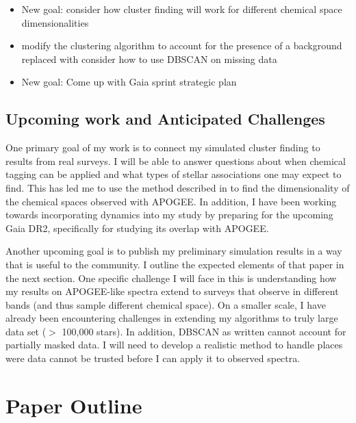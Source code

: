 \documentclass[11pt]{article}
\begin{document}
\begin{itemize}
\begin{itemize}
\begin{itemize}
		\end{itemize}
		\item New goal: {\color{ForestGreen} consider how cluster finding will work for different chemical space dimensionalities}
		\item {\color{BurntOrange} modify the clustering algorithm to account for the presence of a background} replaced with {\color{ForestGreen} consider how to use DBSCAN on missing data}
		\item New goal: {\color{RoyalBlue}Come up with Gaia sprint strategic plan}
		\end{itemize}
	\end{itemize}
    
    \subsection*{Upcoming work and Anticipated Challenges} 
    
    One primary goal of my work is to connect my simulated cluster finding to results from real surveys. I will be able to answer questions about when chemical tagging can be applied and what types of stellar associations one may expect to find. This has led me to use the method described in \citet{Price-Jones2018} to find the dimensionality of the chemical spaces observed with APOGEE. In addition, I have been working towards incorporating dynamics into my study by preparing for the upcoming Gaia DR2, specifically for studying its overlap with APOGEE.
    
    Another upcoming goal is to publish my preliminary simulation results in a way that is useful to the community. I outline the expected elements of that paper in the next section. One specific challenge I will face in this is understanding how my results on APOGEE-like spectra extend to surveys that observe in different bands (and thus sample different chemical space). On a smaller scale, I have already been encountering challenges in extending my algorithms to truly large data set ($>$ 100,000 stars). In addition, DBSCAN as written cannot account for partially masked data. I will need to develop a realistic method to handle places were data cannot be trusted before I can apply it to observed spectra.
   
 
\section*{Paper Outline}
\end{document}
